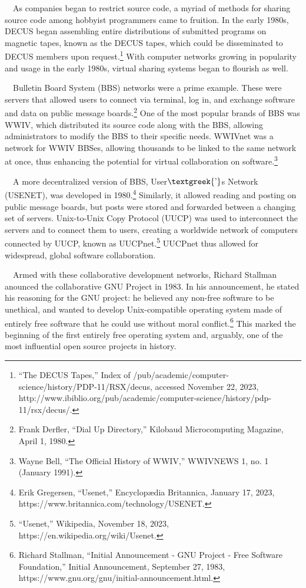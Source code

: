 \documentclass{article}
\begin{document}
\ \ As companies began to restrict source code, a myriad of methods for sharing source code among hobbyist programmers
came to fruition. In the early 1980s, DECUS began assembling entire distributions of submitted programs on magnetic
tapes, known as the DECUS tapes, which could be disseminated to DECUS members upon request.\footnote{“The DECUS Tapes,”
Index of /pub/academic/computer-science/history/PDP-11/RSX/decus, accessed November 22, 2023,
http://www.ibiblio.org/pub/academic/computer-science/history/pdp-11/rsx/decus/.} With computer networks growing in
popularity and usage in the early 1980s, virtual sharing systems began to flourish as well.

\ \ Bulletin Board System (BBS) networks were a prime example. These were servers that allowed users to connect via
terminal, log in, and exchange software and data on public message boards.\footnote{Frank Derfler, “Dial Up Directory,”
Kilobaud Microcomputing Magazine, April 1, 1980.} One of the most popular brands of BBS was WWIV, which distributed its
source code along with the BBS, allowing administrators to modify the BBS to their specific needs. WWIVnet was a
network for WWIV BBSes, allowing thousands to be linked to the same network at once, thus enhancing the potential for
virtual collaboration on software.\footnote{Wayne Bell, “The Official History of WWIV,” WWIVNEWS 1, no. 1 (January
1991).}

\ \ A more decentralized version of BBS, User$\text{\textgreek{’}}$s Network (USENET), was developed in
1980.\footnote{Erik Gregersen, “Usenet,” Encyclopædia Britannica, January 17, 2023,
https://www.britannica.com/technology/USENET.} Similarly, it allowed reading and posting on public message boards, but
posts were stored and forwarded between a changing set of servers. Unix-to-Unix Copy Protocol (UUCP) was used to
interconnect the servers and to connect them to users, creating a worldwide network of computers connected by UUCP,
known as UUCPnet.\footnote{“Usenet,” Wikipedia, November 18, 2023, https://en.wikipedia.org/wiki/Usenet.} UUCPnet thus
allowed for widespread, global software collaboration.

\ \ Armed with these collaborative development networks, Richard Stallman anounced the collaborative GNU Project in
1983. In his announcement, he stated his reasoning for the GNU project: he believed any non-free software to be
unethical, and wanted to develop Unix-compatible operating system made of entirely free software that he could use
without moral conflict.\footnote{Richard Stallman, “Initial Announcement - GNU Project - Free Software Foundation,”
Initial Announcement, September 27, 1983, https://www.gnu.org/gnu/initial-announcement.html.} This marked the beginning
of the first entirely free operating system and, arguably, one of the most influential open source projects in history.
\end{document}
